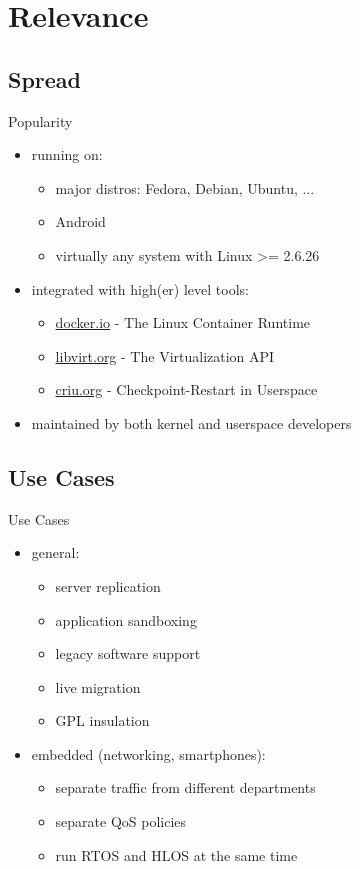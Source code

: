 \section{Relevance}

\subsection{Spread}

\begin{frame}{Popularity}
	\begin{itemize}
	\item running on:
		\begin{itemize}
		\item major distros: Fedora, Debian, Ubuntu, ...
		\item Android
		\item virtually any system with Linux >= 2.6.26
		\end{itemize}
	\item integrated with high(er) level tools:
		\begin{itemize}
		\item \url{docker.io} - The Linux Container Runtime
		\item \url{libvirt.org} - The Virtualization API
		\item \url{criu.org} - Checkpoint-Restart in Userspace
		\end{itemize}
	\item maintained by both kernel and userspace developers
	\end{itemize}
\end{frame}

\subsection{Use Cases}

\begin{frame}{Use Cases}
	\begin{itemize}
	\item general:
		\begin{itemize}
		\item server replication
		\item application sandboxing
		\item legacy software support
		\item live migration
		\item GPL insulation
		\end{itemize}
	\item embedded (networking, smartphones):
		\begin{itemize}
		\item separate traffic from different departments
		\item separate QoS policies
		\item run RTOS and HLOS at the same time
		\end{itemize}
	\end{itemize}
\end{frame}


